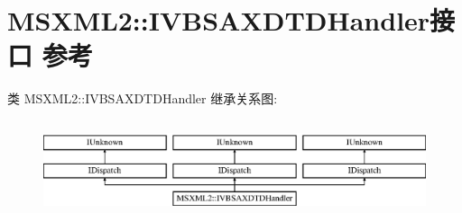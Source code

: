 \hypertarget{interface_m_s_x_m_l2_1_1_i_v_b_s_a_x_d_t_d_handler}{}\section{M\+S\+X\+M\+L2\+:\+:I\+V\+B\+S\+A\+X\+D\+T\+D\+Handler接口 参考}
\label{interface_m_s_x_m_l2_1_1_i_v_b_s_a_x_d_t_d_handler}
类 M\+S\+X\+M\+L2\+:\+:I\+V\+B\+S\+A\+X\+D\+T\+D\+Handler 继承关系图\+:\begin{figure}[H]
\begin{center}
\leavevmode
\includegraphics[height=2.871795cm]{interface_m_s_x_m_l2_1_1_i_v_b_s_a_x_d_t_d_handler}
\end{center}
\end{figure}
